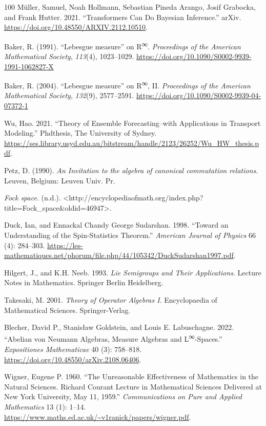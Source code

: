 \documentclass[11pt]{book}
\begin{document}
\begin{thebibliography}{100}
 Müller, Samuel, Noah Hollmann, Sebastian Pineda Arango, Josif Grabocka,
and Frank Hutter. 2021. {``Transformers Can Do Bayesian Inference.''}
arXiv. \url{https://doi.org/10.48550/ARXIV.2112.10510}.

 Baker, R. (1991). {``Lebesgue measure''} on R\textsuperscript{∞}.
\emph{Proceedings of the American Mathematical Society}, \emph{113}(4),
1023--1029. \url{https://doi.org/10.1090/S0002-9939-1991-1062827-X}

 Baker, R. (2004). {``Lebesgue measure''} on R\textsuperscript{∞}, II.
\emph{Proceedings of the American Mathematical Society}, \emph{132}(9),
2577--2591. \url{https://doi.org/10.1090/S0002-9939-04-07372-1}

 Wu, Hao. 2021. {``Theory of Ensemble Forecasting--with Applications in
Transport Modeling.''} Phdthesis, The University of Sydney.
\url{https://ses.library.usyd.edu.au/bitstream/handle/2123/26252/Wu_HW_thesis.pdf}.

 Petz, D. (1990). \emph{An Invitation to the algebra of canonical
commutation relations}. Leuven, Belgium: Leuven Univ. Pr.

 \emph{Fock space}. (n.d.).
\textless http://encyclopediaofmath.org/index.php?title=Fock\_space\&oldid=46947\textgreater.

 Duck, Ian, and Ennackal Chandy George Sudarshan. 1998. {``Toward an
Understanding of the Spin-Statistics Theorem.''} \emph{American Journal
of Physics} 66 (4): 284--303.
\url{https://les-mathematiques.net/phorum/file.php/44/105342/DuckSudarshan1997.pdf}.

 Hilgert, J., and K.H. Neeb. 1993. \emph{Lie Semigroups and Their
Applications}. Lecture Notes in Mathematics. Springer Berlin Heidelberg.

 Takesaki, M. 2001. \emph{Theory of Operator Algebras I}. Encyclopaedia
of Mathematical Sciences. Springer-Verlag.

 Blecher, David P., Stanisław Goldstein, and Louis E. Labuschagne. 2022.
{``Abelian von Neumann Algebras, Measure Algebras and
L\textsuperscript{∞}-Spaces.''} \emph{Expositiones Mathematicae} 40 (3):
758--818. \url{https://doi.org/10.48550/arXiv.2108.06406}.

 Wigner, Eugene P. 1960. {``The Unreasonable Effectiveness of Mathematics
in the Natural Sciences. Richard Courant Lecture in Mathematical
Sciences Delivered at New York University, May 11, 1959.''}
\emph{Communications on Pure and Applied Mathematics} 13 (1): 1--14.
\url{https://www.maths.ed.ac.uk/~v1ranick/papers/wigner.pdf}.


\end{thebibliography}
\end{document}
